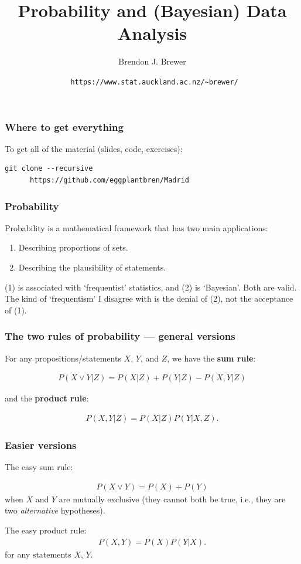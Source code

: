 \documentclass{beamer}
\title{Probability and (Bayesian) Data Analysis}
\author{Brendon J. Brewer}
\institute{Department of Statistics\\
The University of Auckland}
\date{{\tt \color{blue} https://www.stat.auckland.ac.nz/\~{ }brewer/}}
\begin{document}
\frame{\titlepage}


\begin{frame}[t, fragile]
\frametitle{Where to get everything}

To get all of the material (slides, code, exercises):\vspace{1em}

\begin{center}
\begin{verbatim}
git clone --recursive
      https://github.com/eggplantbren/Madrid
\end{verbatim}
\end{center}

\end{frame}



\begin{frame}
\frametitle{Probability}

Probability is a mathematical framework that has two main applications:
\vspace{0.5em}
\begin{enumerate}
  \item[(1)] Describing proportions of sets.
  \item[(2)] Describing the plausibility of statements.
\end{enumerate}
\vspace{1em}
(1) is associated with `frequentist' statistics, and (2) is `Bayesian'.
Both are valid. The kind of `frequentism' I disagree with is the denial
of (2), not the acceptance of (1).

\end{frame}


\begin{frame}
\frametitle{The two rules of probability --- general versions}
For any propositions/statements $X$, $Y$, and $Z$, we have
the {\bf sum rule}:

\begin{align}
P(X \vee Y | Z) = P(X | Z) + P(Y | Z) - P(X, Y | Z)
\end{align}

and the {\bf product rule}:

\begin{align}
P(X, Y | Z) = P(X | Z)P(Y | X, Z).
\end{align}

\end{frame}


\begin{frame}
\frametitle{Easier versions}
The easy sum rule:

\begin{align}
P(X \vee Y) = P(X) + P(Y)
\end{align}
when $X$ and $Y$ are mutually exclusive (they cannot both be true, i.e.,
they are two {\em alternative} hypotheses).

The easy product rule:
\begin{align}
P(X, Y) = P(X)P(Y | X).
\end{align}
for any statements $X$, $Y$.

\end{frame}
\end{document}
